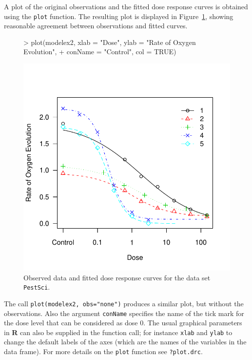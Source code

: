 \documentclass[a4paper]{article}
\begin{document}
\newpage
A plot of the original observations and the fitted dose response curves is obtained using the \verb+plot+ function. The resulting plot is displayed
in Figure~\ref{sec5-plot2}, showing reasonable agreement between observations and fitted curves.

\begin{figure}[!htbp]
\begin{center}

\begin{Schunk}
\begin{Sinput}
> plot(modelex2, xlab = "Dose", ylab = "Rate of Oxygen Evolution", 
+     conName = "Control", col = TRUE)
\end{Sinput}
\end{Schunk}
\includegraphics{drc-sec5-plot2}
\caption{Observed data and fitted dose response curves for the data set \texttt{PestSci}.} \label{sec5-plot2}
\end{center}
\end{figure}

The call \verb+plot(modelex2, obs="none")+ produces a similar plot,
but without the observations. Also the argument \verb+conName+ specifies the name of the tick mark for the dose level that can be considered as dose 0.
The usual graphical parameters in \textbf{R} can also be supplied in the function call; for instance \verb+xlab+
and \verb+ylab+ to change the default labels of the axes (which are the names of the variables in the data frame).
For more details on the \verb+plot+ function see \verb+?plot.drc+.
\end{document}
